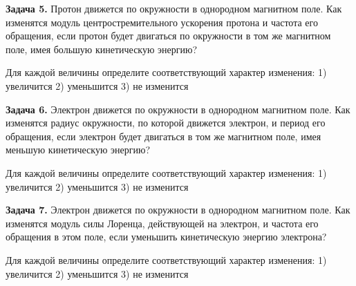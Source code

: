 \begin{taskbasic}[code={\label{task:elem_mag_v7_n15}}]
\textbf{Задача 5.} Протон движется по окружности в однородном магнитном поле. Как изменятся модуль центростремительного ускорения протона и частота его обращения, если протон будет двигаться по окружности в том же магнитном поле, имея большую кинетическую энергию?

Для каждой величины определите соответствующий характер изменения:
1) увеличится
2) уменьшится
3) не изменится

\end{taskbasic}

\begin{taskbasic}[code={\label{task:elem_mag_v8_n15}}]
\textbf{Задача 6.} Электрон движется по окружности в однородном магнитном поле. Как изменятся радиус окружности, по которой движется электрон, и период его обращения, если электрон будет двигаться в том же магнитном поле, имея меньшую кинетическую энергию?

Для каждой величины определите соответствующий характер изменения:
1) увеличится
2) уменьшится
3) не изменится

\end{taskbasic}

\begin{taskbasic}[code={\label{task:elem_mag_v9_n15}}]
\textbf{Задача 7.} Электрон движется по окружности в однородном магнитном поле. Как изменятся модуль силы Лоренца, действующей на электрон, и частота его обращения в этом поле, если уменьшить кинетическую энергию электрона?

Для каждой величины определите соответствующий характер изменения:
1) увеличится
2) уменьшится
3) не изменится

\end{taskbasic}

